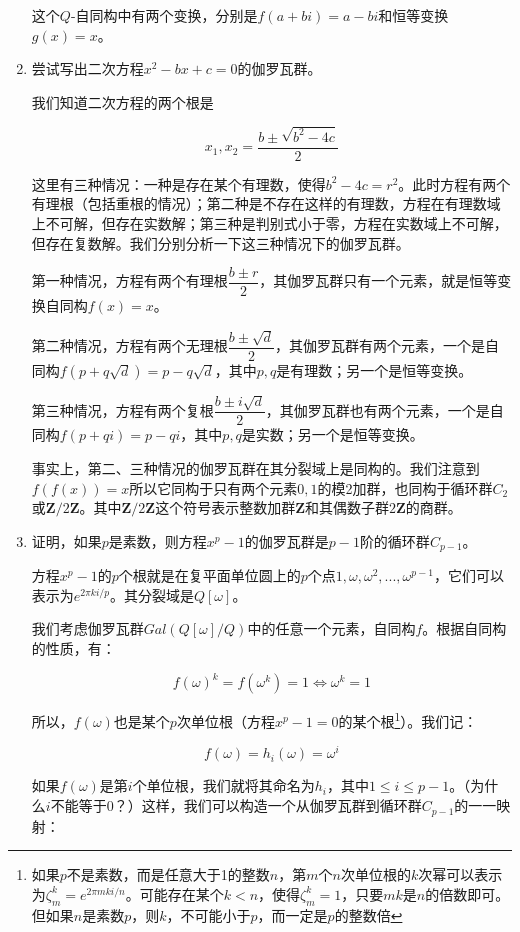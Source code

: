 \documentclass[UTF8]{article}
\begin{document}
\begin{enumerate}
这个$Q$-自同构中有两个变换，分别是$f(a + bi) = a - bi$和恒等变换$g(x) = x$。

\item {尝试写出二次方程$x^2 - bx + c = 0$的伽罗瓦群。}

我们知道二次方程的两个根是

\[
x_1, x_2 = \dfrac{b \pm \sqrt{b^2 - 4c}}{2}
\]

这里有三种情况：一种是存在某个有理数，使得$b^2 - 4c = r^2$。此时方程有两个有理根（包括重根的情况）；第二种是不存在这样的有理数，方程在有理数域上不可解，但存在实数解；第三种是判别式小于零，方程在实数域上不可解，但存在复数解。我们分别分析一下这三种情况下的伽罗瓦群。

第一种情况，方程有两个有理根$\dfrac{b \pm r}{2}$，其伽罗瓦群只有一个元素，就是恒等变换自同构$f(x) = x$。

第二种情况，方程有两个无理根$\dfrac{b \pm \sqrt{d}}{2}$，其伽罗瓦群有两个元素，一个是自同构$f(p + q \sqrt{d}) = p - q \sqrt{d}$，其中$p, q$是有理数；另一个是恒等变换。

第三种情况，方程有两个复根$\dfrac{b \pm i \sqrt{d}}{2}$，其伽罗瓦群也有两个元素，一个是自同构$f(p + q i) = p - q i$，其中$p, q$是实数；另一个是恒等变换。

事实上，第二、三种情况的伽罗瓦群在其分裂域上是同构的。我们注意到$f(f(x)) = x$所以它同构于只有两个元素${0, 1}$的模2加群，也同构于循环群$C_2$或$\pmb{Z}/2\pmb{Z}$。其中$\pmb{Z}/2\pmb{Z}$这个符号表示整数加群$\pmb{Z}$和其偶数子群$2\pmb{Z}$的商群。

\item {证明，如果$p$是素数，则方程$x^p - 1$的伽罗瓦群是$p-1$阶的循环群$C_{p-1}$。}

方程$x^p -1$的$p$个根就是在复平面单位圆上的$p$个点$1, \omega, \omega^2, ..., \omega^{p-1}$，它们可以表示为$e^{2 \pi k i / p}$。其分裂域是$Q[\omega]$。

我们考虑伽罗瓦群$Gal(Q[\omega]/Q)$中的任意一个元素，自同构$f$。根据自同构的性质，有：

\[
f(\omega)^k = f(\omega^k) = 1 \iff \omega^k = 1
\]

所以，$f(\omega)$也是某个$p$次单位根（方程$x^p - 1 = 0$的某个根\footnote{如果$p$不是素数，而是任意大于1的整数$n$，第$m$个$n$次单位根的$k$次幂可以表示为$\zeta_m^k = e^{2 \pi m k i / n}$。可能存在某个$k < n$，使得$\zeta_m^k = 1$，只要$mk$是$n$的倍数即可。但如果$n$是素数$p$，则$k$，不可能小于$p$，而一定是$p$的整数倍}）。我们记：

\[
f(\omega) = h_i(\omega) = \omega^{i}
\]

如果$f(\omega)$是第$i$个单位根，我们就将其命名为$h_i$，其中$1 \leq i \leq p-1$。（为什么$i$不能等于0？）这样，我们可以构造一个从伽罗瓦群到循环群$C_{p-1}$的一一映射：


\end{enumerate}
\end{document}
